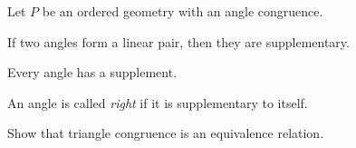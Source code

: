 \begin{prop}
Let \(P\) be an ordered geometry with an angle congruence.
\begin{proplist}
\item If two angles form a linear pair, then they are supplementary.
\item Every angle has a supplement.
\end{proplist}
\end{prop}

\begin{dfn}
An angle is called \emph{right} if it is supplementary to itself.
\end{dfn}


\Exercises%

\begin{exercise}
Show that triangle congruence is an equivalence relation.
\end{exercise}

